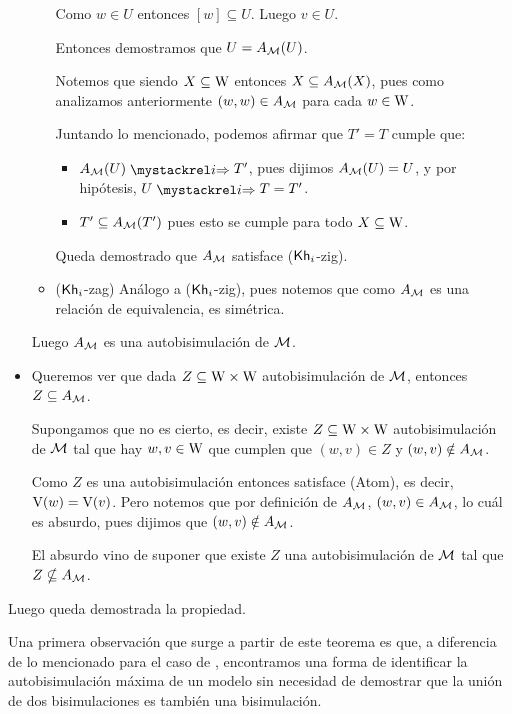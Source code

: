 \begin{demostracion}
\begin{itemize}
\begin{itemize}
            Como $w \in U$ entonces $[w] \subseteq U$. Luego $v \in U$.

            Entonces demostramos que $U = A_{\mathcal{M}}(U)$.

            Notemos que siendo $X \subseteq \mathrm{W}$ entonces $X \subseteq A_{\mathcal{M}}(X)$, pues como analizamos anteriormente 
            $(w,w) \in A_{\mathcal{M}}$ para cada $w \in \mathrm{W}$.

            Juntando lo mencionado, podemos afirmar que $T' = T$ cumple que:

             \begin{itemize}
                \item $A_\modults(U) \ultsExecAgi T'$, pues dijimos $A_{\mathcal{M}}(U) = U$, y por hipótesis, $U \ultsExecAgi T = T'$.  
                \item $T' \subseteq A_{\mathcal{M}}(T')$ pues esto se cumple para todo $X \subseteq \mathrm{W}$.
            \end{itemize}
            Queda demostrado que $A_{\mathcal{M}}$ satisface ($\mathsf{Kh}_i$-zig).

            \item ($\mathsf{Kh}_i$-zag) Análogo a ($\mathsf{Kh}_i$-zig), pues notemos que como $A_{\mathcal{M}}$ es una relación de equivalencia, es simétrica.
        \end{itemize}

        Luego $A_{\mathcal{M}}$ es una autobisimulación de $\mathcal{M}$.
        
        \item Queremos ver que dada $Z \subseteq \mathrm{W} \times \mathrm{W}$ autobisimulación de $\mathcal{M}$, entonces $Z \subseteq A_{\mathcal{M}}$.
        
        Supongamos que no es cierto, es decir, existe $Z \subseteq \mathrm{W} \times \mathrm{W}$ autobisimulación de $\mathcal{M}$ tal que hay 
        $w,v \in \mathrm{W}$ que cumplen que $(w,v) \in Z$ y $(w,v) \notin A_{\mathcal{M}}$. 

        Como $Z$ es una autobisimulación entonces satisface (Atom), es decir, $\mathrm{V}(w) = \mathrm{V}(v)$. Pero notemos que por definición de 
        $A_{\mathcal{M}}$, $(w,v) \in A_{\mathcal{M}}$, lo cuál es absurdo, pues dijimos que $(w,v) \notin A_{\mathcal{M}}$.

        El absurdo vino de suponer que existe $Z$ una autobisimulación de $\mathcal{M}$ tal que $Z \nsubseteq A_{\mathcal{M}}$.    
    \end{itemize}
    Luego queda demostrada la propiedad.
\end{demostracion}

Una primera observación que surge a partir de este teorema es que, a diferencia de lo mencionado para el caso de \bml, 
encontramos una forma de identificar la autobisimulación máxima de un modelo sin necesidad de demostrar que la unión de 
dos bisimulaciones es también una bisimulación. 

